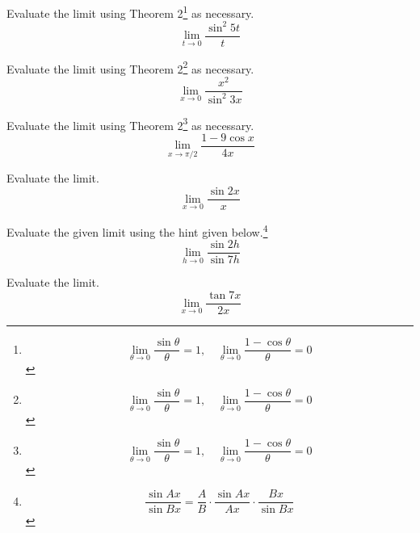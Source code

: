 \documentclass[12pt,addpoints, answers, fleqn]{exam}
\begin{document}
\begin{teacher}
\begin{questions}
Evaluate the limit using Theorem 2\footnote{\[ \lim_{\theta \to 0} \frac{\sin \theta}{\theta} =1, \quad \lim_{\theta \to 0} \frac{1 - \cos \theta}{\theta} =0 \]} as necessary.
\[
\lim_{t \to 0} \frac{\sin^2 5t}{t}
\]
\begin{solution}

\end{solution}

\question 	%

Evaluate the limit using Theorem 2\footnote{\[ \lim_{\theta \to 0} \frac{\sin \theta}{\theta} =1, \quad \lim_{\theta \to 0} \frac{1 - \cos \theta}{\theta} =0 \]} as necessary.
\[
\lim_{x \to 0} \frac{x^2}{\sin^2 3x}
\]
\begin{solution}

\end{solution}

\question 	%

Evaluate the limit using Theorem 2\footnote{\[ \lim_{\theta \to 0} \frac{\sin \theta}{\theta} =1, \quad \lim_{\theta \to 0} \frac{1 - \cos \theta}{\theta} =0 \]} as necessary.
\[
\lim_{x \to \pi/2} \frac{1 - 9 \cos x}{4x}
\]
\begin{solution}

\end{solution}

\question 	%

Evaluate the limit.
\[
\lim_{x \to 0} \frac{\sin 2x}{x}
\]
\begin{solution}

\end{solution}

\question 	%

Evaluate the given limit using the hint given below.\footnote{\[\frac{\sin Ax}{\sin Bx} = \frac{A}{B} \cdot \frac{\sin Ax}{Ax} \cdot \frac{Bx}{\sin Bx} \]}
\[
\lim_{h \to 0} \frac{\sin 2 h}{\sin 7 h}
\]
\begin{solution}

\end{solution}


\question 	%

Evaluate the limit.
\[
\lim_{x \to 0} \frac{\tan 7x}{2x}
\]
\begin{solution}

\end{solution}

\question 	%


\end{questions}
\end{teacher}
\end{document}

